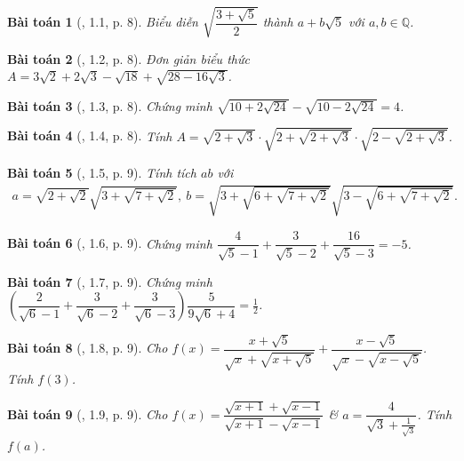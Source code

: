 \documentclass{article}
\newtheorem{baitoan}{Bài toán}
\begin{document}
\begin{baitoan}[\cite{TLCT_THCS_Toan_9_dai_so}, 1.1, p. 8]
	Biểu diễn $\sqrt{\dfrac{3 + \sqrt{5}}{2}}$ thành $a + b\sqrt{5}$ với $a,b\in\mathbb{Q}$.
\end{baitoan}

\begin{baitoan}[\cite{TLCT_THCS_Toan_9_dai_so}, 1.2, p. 8]
	Đơn giản biểu thức $A = 3\sqrt{2} + 2\sqrt{3} - \sqrt{18} + \sqrt{28 - 16\sqrt{3}}$.
\end{baitoan}

\begin{baitoan}[\cite{TLCT_THCS_Toan_9_dai_so}, 1.3, p. 8]
	Chứng minh $\sqrt{10 + 2\sqrt{24}} - \sqrt{10 - 2\sqrt{24}} = 4$.
\end{baitoan}

\begin{baitoan}[\cite{TLCT_THCS_Toan_9_dai_so}, 1.4, p. 8]
	Tính $A = \sqrt{2 + \sqrt{3}}\cdot\sqrt{2 + \sqrt{2 + \sqrt{3}}}\cdot\sqrt{2 - \sqrt{2 + \sqrt{3}}}$.
\end{baitoan}

\begin{baitoan}[\cite{TLCT_THCS_Toan_9_dai_so}, 1.5, p. 9]
	Tính tích $ab$ với
	\begin{align*}
		a = \sqrt{2 + \sqrt{2}}\sqrt{3 + \sqrt{7 + \sqrt{2}}},\ b = \sqrt{3 + \sqrt{6 + \sqrt{7 + \sqrt{2}}}}\sqrt{3 - \sqrt{6 + \sqrt{7 + \sqrt{2}}}}.
	\end{align*}
\end{baitoan}

\begin{baitoan}[\cite{TLCT_THCS_Toan_9_dai_so}, 1.6, p. 9]
	Chứng minh $\dfrac{4}{\sqrt{5} - 1} + \dfrac{3}{\sqrt{5} - 2} + \dfrac{16}{\sqrt{5} - 3} = -5$.
\end{baitoan}

\begin{baitoan}[\cite{TLCT_THCS_Toan_9_dai_so}, 1.7, p. 9]
	Chứng minh $\left(\dfrac{2}{\sqrt{6} - 1} + \dfrac{3}{\sqrt{6} - 2} + \dfrac{3}{\sqrt{6} - 3}\right)\dfrac{5}{9\sqrt{6} + 4} = \frac{1}{2}$.
\end{baitoan}

\begin{baitoan}[\cite{TLCT_THCS_Toan_9_dai_so}, 1.8, p. 9]
	Cho $f(x) = \dfrac{x + \sqrt{5}}{\sqrt{x} + \sqrt{x + \sqrt{5}}} + \dfrac{x - \sqrt{5}}{\sqrt{x} - \sqrt{x - \sqrt{5}}}$. Tính $f(3)$.
\end{baitoan}

\begin{baitoan}[\cite{TLCT_THCS_Toan_9_dai_so}, 1.9, p. 9]
	Cho $f(x) = \dfrac{\sqrt{x + 1} + \sqrt{x - 1}}{\sqrt{x + 1} - \sqrt{x - 1}}$ \& $a = \dfrac{4}{\sqrt{3} + \frac{1}{\sqrt{3}}}$. Tính $f(a)$.
\end{baitoan}
\end{document}
